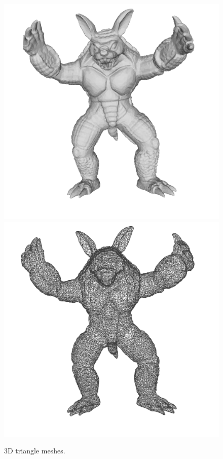 \begin{figure}[h!]
  \centering
  \includegraphics[scale=0.2]{images/armadillo-white04}
  \endminipage
  \includegraphics[scale=0.2]{images/armadillo-white205}
  \endminipage
\caption{3D triangle meshes.}

\end{figure}

